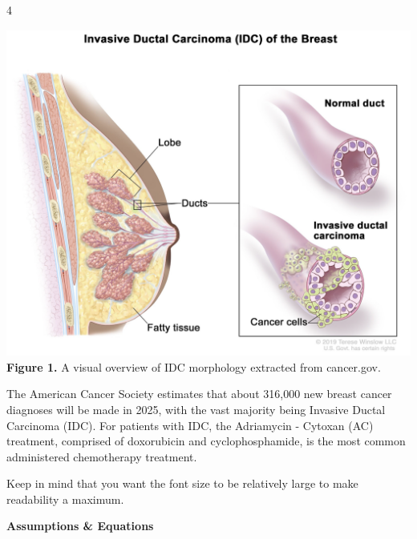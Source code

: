 \documentclass[a0]{4by3}
\newcommand{\NumColumns}{4}
\begin{document}

\color{black}
\noindent
\begin{minipage}{\linewidth + 2\fboxsep}
\begin{multicols*}{\NumColumns}
        \begin{center}
          \includegraphics[width=1\linewidth,trim={0 1.5cm 0 4.25cm},clip]{./imgs/idc}
          {\small \textbf{Figure 1.} A visual overview of IDC morphology extracted from cancer.gov.}
        \end{center}
        
        \large
       The American Cancer Society estimates that about 316,000 new breast cancer diagnoses will be made in 2025, with the vast majority being Invasive Ductal Carcinoma (IDC).
       For patients with IDC, the Adriamycin - Cytoxan (AC) treatment, comprised of doxorubicin and cyclophosphamide, is the most common administered chemotherapy treatment.

Keep in mind that you want the font size to be relatively large to make readability a maximum.



    
        \begin{center}
        \LARGE{\textbf{Assumptions \& Equations}}
        \end{center}
        \vspace{5mm}
            \large
        

\end{multicols*}
\end{minipage}
\end{document}
